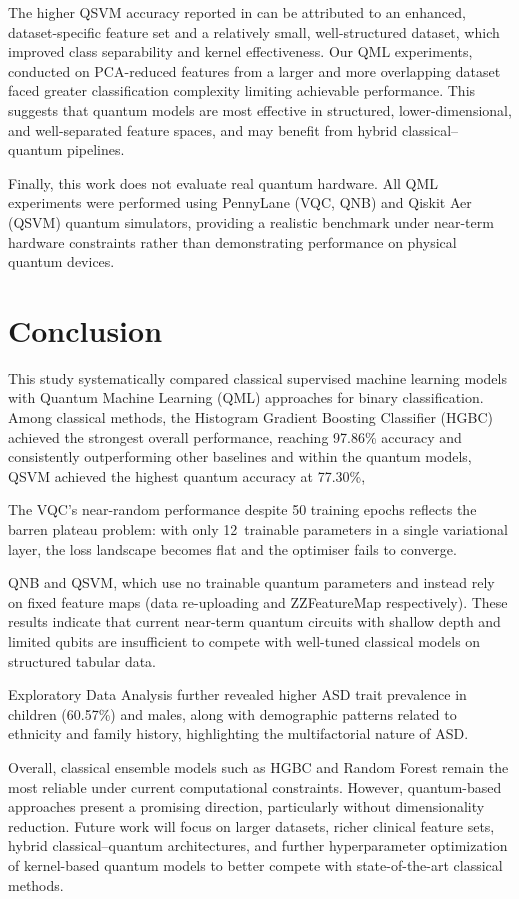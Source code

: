 \documentclass[runningheads]{llncs}
\begin{document}
The higher QSVM accuracy reported in \cite{saranya2025} can be attributed to an enhanced, dataset-specific feature set and a relatively small, well-structured dataset, which improved class separability and kernel effectiveness. Our QML experiments, conducted on PCA-reduced features from a larger and more overlapping dataset faced greater classification complexity limiting achievable performance. This suggests that quantum models are most effective in structured, lower-dimensional, and well-separated feature spaces, and may benefit from hybrid classical--quantum pipelines.

Finally, this work does not evaluate real quantum hardware. All QML experiments were performed using PennyLane (VQC, QNB) and Qiskit Aer (QSVM) quantum simulators, providing a realistic benchmark under near-term hardware constraints rather than demonstrating performance on physical quantum devices.


\section{Conclusion}
\label{sec:conclusion}

This study systematically compared classical supervised machine learning models with Quantum Machine Learning (QML) approaches for binary classification. Among classical methods, the Histogram Gradient Boosting Classifier (HGBC) achieved the strongest overall performance, reaching 97.86\% accuracy and consistently outperforming other baselines and within the quantum models, QSVM achieved the highest quantum accuracy at 77.30\%, 

The VQC's near-random performance despite 50 training epochs reflects the barren plateau problem: with only 12~trainable parameters in a single variational layer, the loss landscape becomes flat and the optimiser fails to converge.

QNB and QSVM, which use no trainable quantum parameters and instead rely on fixed feature maps (data re-uploading and ZZFeatureMap respectively). These results indicate that current near-term quantum circuits with shallow depth and limited qubits are insufficient to compete with well-tuned classical models on structured tabular data.

Exploratory Data Analysis further revealed higher ASD trait prevalence in children (60.57\%) and males, along with demographic patterns related to ethnicity and family history, highlighting the multifactorial nature of ASD.

Overall, classical ensemble models such as HGBC and Random Forest remain the most reliable under current computational constraints. However, quantum-based approaches present a promising direction, particularly without dimensionality reduction. Future work will focus on larger datasets, richer clinical feature sets, hybrid classical--quantum architectures, and further hyperparameter optimization of kernel-based quantum models to better compete with state-of-the-art classical methods.
\end{document}
